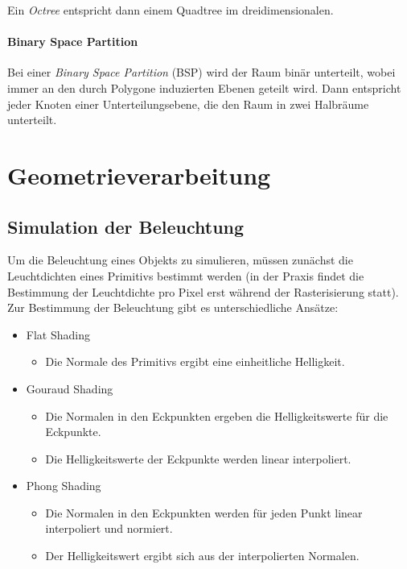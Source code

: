 						Ein \emph{Octree} entspricht dann einem Quadtree im dreidimensionalen.

					\paragraph{Binary Space Partition}
						Bei einer \emph{Binary Space Partition} (BSP) wird der Raum binär unterteilt, wobei immer an den durch Polygone induzierten Ebenen geteilt wird. Dann entspricht jeder Knoten einer Unterteilungsebene, die den Raum in zwei Halbräume unterteilt.

		\section{Geometrieverarbeitung}
			\subsection{Simulation der Beleuchtung}
				Um die Beleuchtung eines Objekts zu simulieren, müssen zunächst die Leuchtdichten eines Primitivs bestimmt werden (in der Praxis findet die Bestimmung der Leuchtdichte pro Pixel erst während der Rasterisierung statt). Zur Bestimmung der Beleuchtung gibt es unterschiedliche Ansätze:
				\begin{itemize}
					\item Flat Shading
						\begin{itemize}
							\item Die Normale des Primitivs ergibt eine einheitliche Helligkeit.
						\end{itemize}
					\item Gouraud Shading
						\begin{itemize}
							\item Die Normalen in den Eckpunkten ergeben die Helligkeitswerte für die Eckpunkte.
							\item Die Helligkeitswerte der Eckpunkte werden linear interpoliert.
						\end{itemize}
					\item Phong Shading
						\begin{itemize}
							\item Die Normalen in den Eckpunkten werden für jeden Punkt linear interpoliert und normiert.
							\item Der Helligkeitswert ergibt sich aus der interpolierten Normalen.
						\end{itemize}
				\end{itemize}

